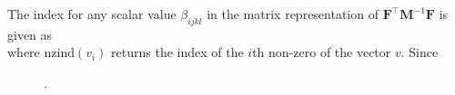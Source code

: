 The index for any scalar value $\beta_{i j k l}$ in the matrix representation of $\textbf{F}^{\intercal}\textbf{M}^{-1}\textbf{F}$ is given as 
\begin{equation}
[(N - 1) i + \text{nzind}(\textbf{f}^{\text{ind}}_{ij}) + l, (N - 1) i + \text{nzind}(\textbf{f}^{\text{ind}}_{ik}) + l]
\end{equation}
\noindent
where $\text{nzind}(v_i)$ returns the index of the $i\text{th}$ non-zero of the vector $v$. Since 




\begin{figure}
    \centering
    
    
    \caption{.}
    \label{fig:todo}
\end{figure}

